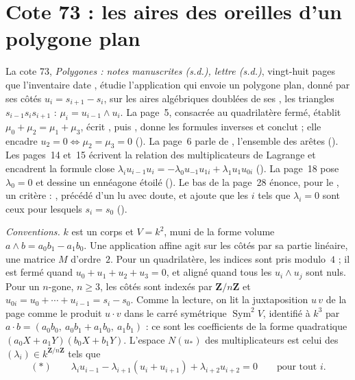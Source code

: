 \section[Cote 73 : les aires des oreilles d'un polygone plan]{Cote 73 : les aires des oreilles d'un polygone plan\protect{}}\label{sec:73}

La cote 73, \emph{Polygones : notes manuscrites (s.d.), lettre (s.d.)}, vingt-huit pages que l'inventaire date \q{[à partir de 1976]}, étudie l'application qui envoie un polygone plan, donné par ses côtés $u_i = s_{i+1} - s_i$, sur les aires algébriques doublées de ses , les triangles $s_{i-1}s_is_{i+1}$ : $\mu_i = u_{i-1} \wedge u_i$. La page~5, consacrée au quadrilatère fermé, établit $\mu_0 + \mu_2 = \mu_1 + \mu_3$, écrit , puis , donne les formules inverses et conclut  ; elle encadre $u_2 = 0 \Leftrightarrow \mu_2 = \mu_3 = 0$ (). La page~6 parle de , l'ensemble des arêtes (). Les pages~14 et~15 écrivent la relation des multiplicateurs de Lagrange et encadrent la formule close $\lambda_i u_{i-1}u_i = -\lambda_0 u_{-1}u_{1i} + \lambda_1 u_1 u_{0i}$ (). La page~18 pose $\lambda_0 = 0$ et dessine un ennéagone étoilé (). Le bas de la page~28 énonce, pour le , un critère : , précédé d'un  lu avec doute, et ajoute que les $i$ tels que $\lambda_i = 0$ sont ceux pour lesquels $s_i = s_0$ ().

\noindent\emph{Conventions.} $k$ est un corps et $V = k^2$, muni de la forme volume $a \wedge b = a_0b_1 - a_1b_0$. Une application affine agit sur les côtés par sa partie linéaire, une matrice $M$ d'ordre~$2$. Pour un quadrilatère, les indices sont pris modulo~$4$ ; il est fermé quand $u_0 + u_1 + u_2 + u_3 = 0$, et aligné quand tous les $u_i \wedge u_j$ sont nuls. Pour un $n$-gone, $n \geq 3$, les côtés sont indexés par $\mathbf{Z}/n\mathbf{Z}$ et $u_{0i} = u_0 + \cdots + u_{i-1} = s_i - s_0$. Comme la lecture, on lit la juxtaposition $u\,v$ de la page comme le produit $u \cdot v$ dans le carré symétrique $\operatorname{Sym}^2 V$, identifié à $k^3$ par $a \cdot b = (a_0b_0,\ a_0b_1 + a_1b_0,\ a_1b_1)$ : ce sont les coefficients de la forme quadratique $(a_0X + a_1Y)(b_0X + b_1Y)$. L'espace $N(u_*)$ des multiplicateurs est celui des $(\lambda_i) \in k^{\mathbf{Z}/n\mathbf{Z}}$ tels que
\[ (\ast) \qquad \lambda_i u_{i-1} - \lambda_{i+1}(u_i + u_{i+1}) + \lambda_{i+2} u_{i+2} = 0 \qquad \text{pour tout } i. \]

